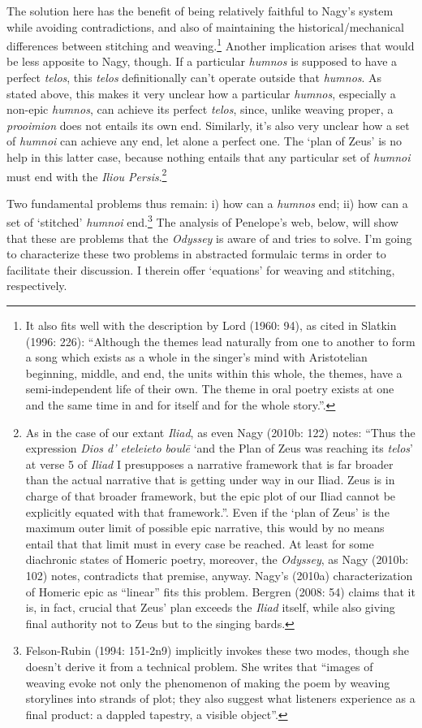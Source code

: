 \documentclass[12pt]{article}
\begin{document}
The solution here has the benefit of being relatively faithful to Nagy's system while avoiding contradictions, and also of maintaining the historical/mechanical differences between stitching and weaving.\footnote{ It also fits well with the description by Lord (1960: 94), as cited in Slatkin (1996: 226): ``Although the themes lead naturally from one to another to form a song which exists as a whole in the singer's mind with Aristotelian beginning, middle, and end, the units within this whole, the themes, have a semi-independent life of their own. The theme in oral poetry exists at one and the same time in and for itself and for the whole story.''.} Another implication arises that would be less apposite to Nagy, though. If a particular \textit{humnos} is supposed to have  a perfect \textit{telos}, this \textit{telos} definitionally can't operate outside that \textit{humnos}. As stated above, this makes it very unclear how a particular \textit{humnos}, especially a non-epic \textit{humnos}, can achieve its perfect \textit{telos}, since, unlike weaving proper, a \textit{prooimion} does not entails its own end. Similarly, it's also very unclear how a set of \textit{humnoi} can achieve any end, let alone a perfect one. The `plan of Zeus' is no help in this latter case, because nothing entails that any particular set of \textit{humnoi} must end with the \textit{Iliou Persis}.\footnote{ As in the case of our extant \textit{Iliad}, as even Nagy (2010b: 122) notes: ``Thus the expression \textit{Dios d’ eteleieto boulē} `and the Plan of Zeus was reaching its \textit{telos}' at verse 5 of \textit{Iliad} I presupposes a narrative framework that is far broader than the actual narrative that is getting under way in our Iliad. Zeus is in charge of that broader framework, but the epic plot of our Iliad cannot be explicitly equated with that framework.''. Even if the `plan of Zeus' is the maximum outer limit of possible epic narrative, this would by no means entail that that limit must in every case be reached. At least for some diachronic states of Homeric poetry, moreover, the \textit{Odyssey}, as Nagy (2010b: 102) notes, contradicts that premise, anyway. Nagy's (2010a) characterization of Homeric epic as ``linear'' fits this problem. Bergren (2008: 54) claims that it is, in fact, crucial that Zeus' plan exceeds the \textit{Iliad} itself, while also giving final authority not to Zeus but to the singing bards.} 


Two fundamental problems thus remain: i) how can a \textit{humnos} end; ii) how can a set of `stitched' \textit{humnoi} end.\footnote{ Felson-Rubin (1994: 151-2n9) implicitly invokes these two modes, though she doesn't derive it from a technical problem. She writes that ``images of weaving evoke not only the phenomenon of making the poem by weaving storylines into strands of plot; they also suggest what listeners experience as a final product: a dappled tapestry, a visible object''.} The analysis of Penelope's web, below, will show that these are problems that the \textit{Odyssey} is aware of and tries to solve. I'm going to characterize these two problems in abstracted formulaic terms in order to facilitate their discussion. I therein offer `equations' for weaving and stitching, respectively.
\end{document}
